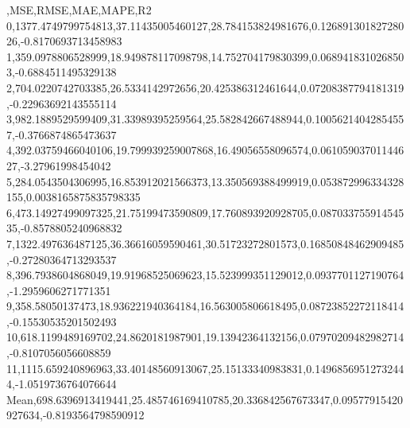 ,MSE,RMSE,MAE,MAPE,R2
0,1377.4749799754813,37.11435005460127,28.784153824981676,0.12689130182728026,-0.8170693713458983
1,359.0978806528999,18.949878117098798,14.752704179830399,0.0689418310268503,-0.6884511495329138
2,704.0220742703385,26.5334142972656,20.425386312461644,0.07208387794181319,-0.22963692143555114
3,982.1889529599409,31.33989395259564,25.582842667488944,0.10056214042854557,-0.3766874865473637
4,392.03759466040106,19.799939259007868,16.49056558096574,0.06105903701144627,-3.27961998454042
5,284.0543504306995,16.853912021566373,13.350569388499919,0.053872996334328155,0.0038165875835798335
6,473.14927499097325,21.75199473590809,17.760893920928705,0.08703375591454535,-0.8578805240968832
7,1322.497636487125,36.36616059590461,30.51723272801573,0.16850848462909485,-0.27280364713293537
8,396.7938604868049,19.91968525069623,15.523999351129012,0.0937701127190764,-1.2959606271771351
9,358.58050137473,18.936221940364184,16.563005806618495,0.08723852272118414,-0.15530535201502493
10,618.1199489169702,24.8620181987901,19.13942364132156,0.07970209482982714,-0.8107056056608859
11,1115.659240896963,33.40148560913067,25.15133340983831,0.14968569512732444,-1.0519736764076644
Mean,698.6396913419441,25.485746169410785,20.336842567673347,0.09577915420927634,-0.8193564798590912
